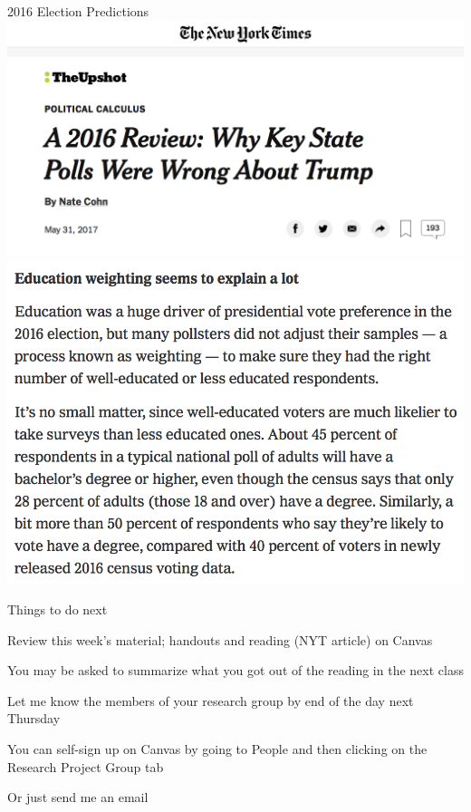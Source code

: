 \documentclass{./../div_teaching_slides}
\begin{document}
\begin{frame}{2016 Election Predictions}
\centering
 \includegraphics[scale=0.14]{nyt2.png} \\
\includegraphics[scale=0.19]{nyt.png} \\
\end{frame}


\begin{frame}{Things to do next}
\begin{witemize}
\item Review this week's material; handouts and reading (NYT article) on Canvas
\item You may be asked to summarize what you got out of the reading in the next class
\item Let me know the members of your research group by end of the day next Thursday
\vspace{0.5em}
\begin{witemize}
\normalsize
\item You can self-sign up on Canvas by going to People and then clicking on the Research Project Group tab
\item Or just send me an email
\end{witemize}
\end{witemize}
\end{frame}
\end{document}
